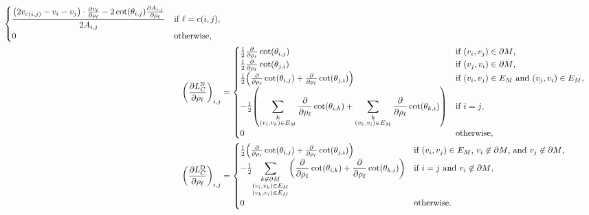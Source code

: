 \begin{align*}
\begin{cases}
		\displaystyle\frac{\pof{2v_{c\pof{i, j}} - v_i - v_j} \cdot \frac{\partial v_\ell}{\partial \rho_\ell} - 2\cot\pof{\theta_{i, j}}\frac{\partial A_{i, j}}{\partial \rho_\ell}}{2A_{i, j}} & \text{if \(\ell = c\pof{i, j}\)}, \\
		0 & \text{otherwise},
	\end{cases} \\
	\pof{\frac{\partial L_C^{\text{N}}}{\partial \rho_\ell}}_{i, j} &= \begin{cases}
		\frac{1}{2}\frac{\partial}{\partial \rho_\ell}\cot\pof{\theta_{i, j}} & \text{if \(\pof{v_i, v_j} \in \partial M\)}, \\
		\frac{1}{2}\frac{\partial}{\partial \rho_\ell}\cot\pof{\theta_{j, i}} & \text{if \(\pof{v_j, v_i} \in \partial M\)}, \\
		\frac{1}{2}\pof{\frac{\partial}{\partial \rho_\ell}\cot\pof{\theta_{i, j}} + \frac{\partial}{\partial \rho_\ell}\cot\pof{\theta_{j, i}}} & \text{if \(\pof{v_i, v_j} \in E_M\) and \(\pof{v_j, v_i} \in E_M\)}, \\
		-\frac{1}{2}\pof{\displaystyle\sum_{\substack{k \\ \pof{v_i, v_k} \in E_M}}\frac{\partial}{\partial \rho_\ell}\cot\pof{\theta_{i, k}} + \sum_{\substack{k \\ \pof{v_k, v_i} \in E_M}}\frac{\partial}{\partial \rho_\ell}\cot\pof{\theta_{k, i}}} & \text{if \(i = j\)}, \\
		0 & \text{otherwise},
	\end{cases} \\
	\pof{\frac{\partial L_C^{\text{D}}}{\partial \rho_\ell}}_{i, j} &= \begin{cases}
		\frac{1}{2}\pof{\frac{\partial}{\partial \rho_\ell}\cot\pof{\theta_{i, j}} + \frac{\partial}{\partial \rho_\ell}\cot\pof{\theta_{j, i}}} & \text{if \(\pof{v_i, v_j} \in E_M\), \(v_i \not\in \partial M\), and \(v_j \not\in \partial M\)}, \\
		-\frac{1}{2}{\displaystyle\sum_{\substack{k \not\in \partial M \\ \pof{v_i, v_k} \in E_M \\ \pof{v_k, v_i} \in E_M}}\pof{\frac{\partial}{\partial \rho_\ell}\cot\pof{\theta_{i, k}} + \frac{\partial}{\partial \rho_\ell}\cot\pof{\theta_{k, i}}}} & \text{if \(i = j\) and \(v_i \not\in \partial M\)}, \\
		0 & \text{otherwise}.
	\end{cases}
\end{align*}
